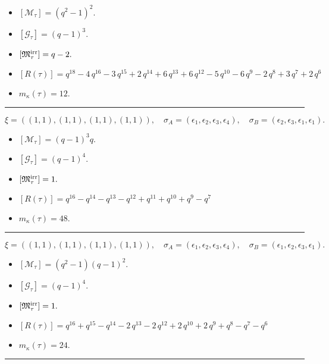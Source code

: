 \documentclass[10pt,a4paper]{amsart}
\begin{document}
\begin{itemize}
 \item $[\mathcal{M}_{\tau}] = {\left(q^{2} - 1\right)}^{2} .$

 \item $[\mathcal{G}_{\tau}] = {\left(q - 1\right)}^{3} .$

 \item $[{\frak M}_{\tau}^{\textrm{irr}}] = q - 2 .$

 \item $[R(\tau)] = q^{18} - 4 \, q^{16} - 3 \, q^{15} + 2 \, q^{14} + 6 \, q^{13} + 6 \, q^{12} - 5 \, q^{10} - 6 \, q^{9} - 2 \, q^{8} + 3 \, q^{7} + 2 \, q^{6} $

 \item $m_{\kappa}(\tau) = 12 .$

 \end{itemize}
\noindent\rule{8cm}{0.4pt}

$$\xi = ({(1, 1)}, {(1, 1), (1, 1)}, {(1, 1)}),\quad \sigma_A = ({{\epsilon_1}}, {{\epsilon_2}, {\epsilon_3}}, {{\epsilon_4}}),\quad \sigma_B = ({{\epsilon_2}}, {{\epsilon_3}, {\epsilon_1}}, {{\epsilon_1}}).$$

\begin{itemize}
 \item $[\mathcal{M}_{\tau}] = {\left(q - 1\right)}^{3} q .$

 \item $[\mathcal{G}_{\tau}] = {\left(q - 1\right)}^{4} .$

 \item $[{\frak M}_{\tau}^{\textrm{irr}}] = 1 .$

 \item $[R(\tau)] = q^{16} - q^{14} - q^{13} - q^{12} + q^{11} + q^{10} + q^{9} - q^{7} $

 \item $m_{\kappa}(\tau) = 48 .$

 \end{itemize}
\noindent\rule{8cm}{0.4pt}

$$\xi = ({(1, 1)}, {(1, 1), (1, 1)}, {(1, 1)}),\quad \sigma_A = ({{\epsilon_1}}, {{\epsilon_2}, {\epsilon_3}}, {{\epsilon_4}}),\quad \sigma_B = ({{\epsilon_1}}, {{\epsilon_2}, {\epsilon_3}}, {{\epsilon_1}}).$$

\begin{itemize}
 \item $[\mathcal{M}_{\tau}] = {\left(q^{2} - 1\right)} {\left(q - 1\right)}^{2} .$

 \item $[\mathcal{G}_{\tau}] = {\left(q - 1\right)}^{4} .$

 \item $[{\frak M}_{\tau}^{\textrm{irr}}] = 1 .$

 \item $[R(\tau)] = q^{16} + q^{15} - q^{14} - 2 \, q^{13} - 2 \, q^{12} + 2 \, q^{10} + 2 \, q^{9} + q^{8} - q^{7} - q^{6} $

 \item $m_{\kappa}(\tau) = 24 .$

 \end{itemize}
\noindent\rule{8cm}{0.4pt}
\end{document}
